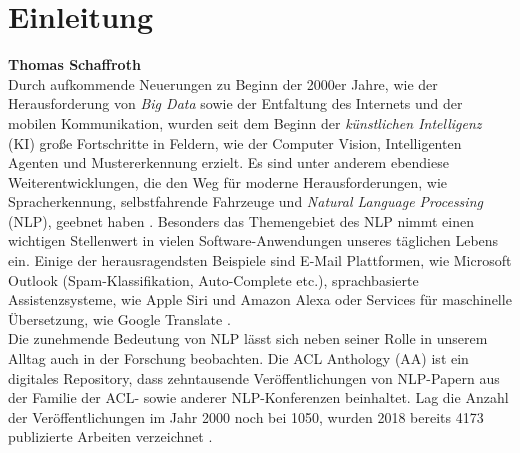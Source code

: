 \documentclass[bachelor,german]{info1thesis}
\begin{document}
\chapter{Einleitung}
\textbf{Thomas Schaffroth} \\
Durch aufkommende Neuerungen zu Beginn der 2000er Jahre, wie der Herausforderung von \textit{Big Data} sowie der Entfaltung des Internets und der mobilen Kommunikation, wurden seit dem Beginn der \textit{künstlichen Intelligenz} (KI) große Fortschritte in Feldern, wie der Computer Vision, Intelligenten Agenten und Mustererkennung erzielt. Es sind unter anderem ebendiese Weiterentwicklungen, die den Weg für moderne Herausforderungen, wie Spracherkennung, selbstfahrende Fahrzeuge und \textit{Natural Language Processing} (NLP), geebnet haben \cite{Perez2018}.
Besonders das Themengebiet des NLP nimmt einen wichtigen Stellenwert in vielen Software-Anwendungen unseres täglichen Lebens ein. Einige der herausragendsten Beispiele sind E-Mail Plattformen, wie Microsoft Outlook (Spam-Klassifikation, Auto-Complete etc.), sprachbasierte Assistenzsysteme, wie Apple Siri und Amazon Alexa oder Services für maschinelle Übersetzung, wie Google Translate \cite{Vajjala2020}. \\
Die zunehmende Bedeutung von NLP lässt sich neben seiner Rolle in unserem Alltag auch in der Forschung beobachten. Die ACL Anthology (AA) ist ein digitales Repository, dass zehntausende Veröffentlichungen von NLP-Papern aus der Familie der ACL- sowie anderer NLP-Konferenzen beinhaltet. Lag die Anzahl der Veröffentlichungen im Jahr 2000 noch bei 1050, wurden 2018 bereits 4173 publizierte Arbeiten verzeichnet \cite{Mohammad2019}. \\
\end{document}

